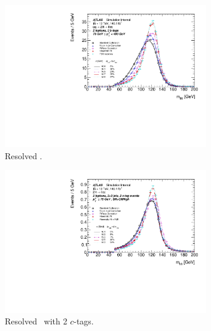 \begin{figure}[h!]
  \centering
  \begin{subfigure}[b]{0.49\textwidth}
    \includegraphics[width=0.98\textwidth]{Images/VH/Correct/CorrectedDist/c_niceMbb_qqZllH125_2tag2pjets_75_400ptv.pdf}
  \caption{Resolved \vhb.} 
  \end{subfigure}
  \begin{subfigure}[b]{0.49\textwidth}
    \includegraphics[width=0.98\textwidth]{Images/VH/Correct/CorrectedDist/c_niceMbb_qqZllHcc125_2ctag_75ptv_23j_modified.pdf}
    \caption{Resolved \vhc\ with 2 $c$-tags.}
  \end{subfigure}
  \begin{subfigure}[b]{0.49\textwidth}

\end{subfigure}
\end{figure}
